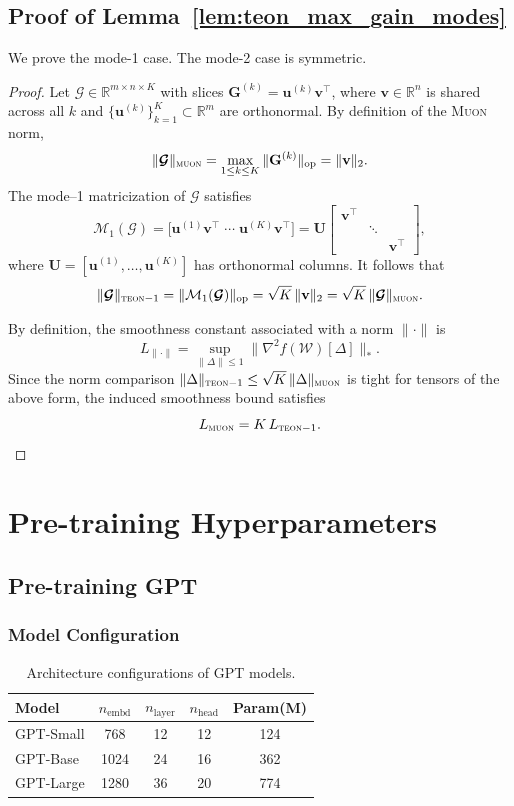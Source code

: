 \documentclass{article}
\newcommand{\ten}[1]{\bm{\mathcal{#1}}}
\newcommand{\mat}[1]{\mathbf{#1}}
\theoremstyle{plain}
\theoremstyle{definition}
\theoremstyle{remark}
\begin{document}
\subsection{Proof of Lemma~\ref{lem:teon_max_gain_modes}}
\label{app:teon_max_gain_modes}
We prove the mode-1 case. The mode-2 case is symmetric.
\begin{proof}
Let $\ten{G}\in\mathbb{R}^{m\times n\times K}$ with slices
$\mat{G}^{(k)}=\mat{u}^{(k)}\mat{v}^\top$, where
$\mat{v}\in\mathbb{R}^n$ is shared across all $k$ and
$\{\mat{u}^{(k)}\}_{k=1}^K\subset\mathbb{R}^m$ are orthonormal.
By definition of the \textsc{Muon} norm,
\[
\|\ten{G}\|_{\textsc{muon}}
=
\max_{1\le k\le K}
\|\mat{G}^{(k)}\|_{\mathrm{op}}
=
\|\mat{v}\|_2 .
\]
The mode--1 matricization of $\ten{G}$ satisfies
\[
\mathcal{M}_1(\ten{G})
=
\bigl[
\mat{u}^{(1)}\mat{v}^\top \;\cdots\;
\mat{u}^{(K)}\mat{v}^\top
\bigr]
=
\mat{U}
\begin{bmatrix}
\mat{v}^\top & & \\
& \ddots & \\
& & \mat{v}^\top
\end{bmatrix},
\]
where $\mat{U}=[\mat{u}^{(1)},\dots,\mat{u}^{(K)}]$ has orthonormal columns.
It follows that
\[
\|\ten{G}\|_{\textsc{teon}-1}
=
\|\mathcal{M}_1(\ten{G})\|_{\mathrm{op}}
=
\sqrt{K}\,\|\mat{v}\|_2
=
\sqrt{K}\,\|\ten{G}\|_{\textsc{muon}} .
\]

By definition, the smoothness constant associated with a norm $\|\cdot\|$ is
\[
L_{\|\cdot\|}
=
\sup_{\|\Delta\|\le 1}
\|\nabla^2 f(\ten{W})[\Delta]\|_* .
\]
Since the norm comparison
$\|\Delta\|_{\textsc{teon}-1}\le\sqrt{K}\,\|\Delta\|_{\textsc{muon}}$
is tight for tensors of the above form, the induced smoothness bound satisfies
\[
L_{\textsc{muon}} = K\,L_{\textsc{teon}-1}.
\]


\end{proof}

\newpage
\section{Pre-training Hyperparameters}
\label{apx:Hyperparameters}
\subsection{Pre-training GPT}
\subsubsection{Model Configuration}
\begin{table}[h]
\centering

\begin{tabular}{lcccc}
\toprule
\textbf{Model} & $n_{\text{embd}}$ & $n_{\text{layer}}$ & $n_{\text{head}}$ & Param(M) \\
\midrule
GPT-Small & 768  & 12 & 12 & 124 \\
GPT-Base & 1024 & 24 & 16 & 362 \\
GPT-Large & 1280 & 36 & 20 & 774\\
\bottomrule
\end{tabular}
\caption{Architecture configurations of GPT models.}
\label{tab:gpt_model_configs}
\end{table}
\end{document}
